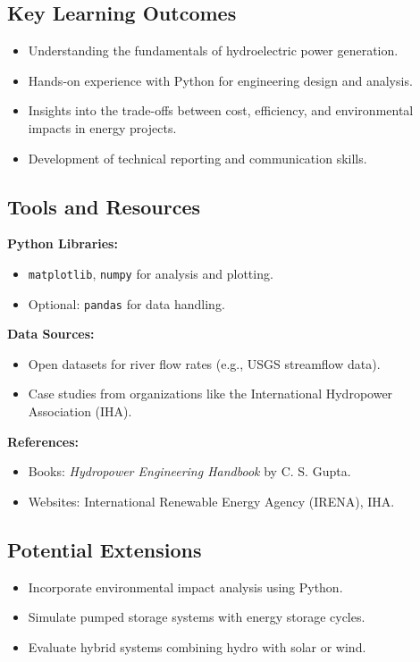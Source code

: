 \documentclass[11pt]{article}
\begin{document}
\subsection{Key Learning Outcomes}
\begin{itemize}
    \item Understanding the fundamentals of hydroelectric power generation.
    \item Hands-on experience with Python for engineering design and analysis.
    \item Insights into the trade-offs between cost, efficiency, and environmental impacts in energy projects.
    \item Development of technical reporting and communication skills.
\end{itemize}

\subsection{Tools and Resources}
\textbf{Python Libraries:}
\begin{itemize}
    \item \texttt{matplotlib}, \texttt{numpy} for analysis and plotting.
    \item Optional: \texttt{pandas} for data handling.
\end{itemize}
\textbf{Data Sources:}
\begin{itemize}
    \item Open datasets for river flow rates (e.g., USGS streamflow data).
    \item Case studies from organizations like the International Hydropower Association (IHA).
\end{itemize}
\textbf{References:}
\begin{itemize}
    \item Books: \textit{Hydropower Engineering Handbook} by C. S. Gupta.
    \item Websites: International Renewable Energy Agency (IRENA), IHA.
\end{itemize}

\subsection{Potential Extensions}
\begin{itemize}
    \item Incorporate environmental impact analysis using Python.
    \item Simulate pumped storage systems with energy storage cycles.
    \item Evaluate hybrid systems combining hydro with solar or wind.
\end{itemize}
\end{document}
